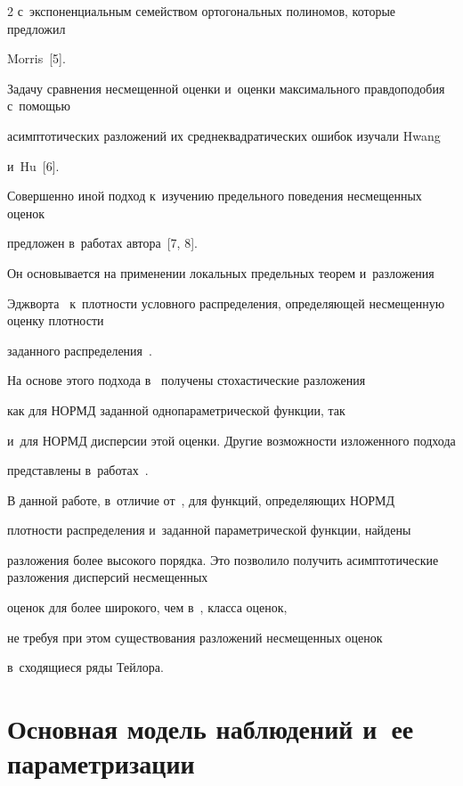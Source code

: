 \begin{multicols}{2}
  с~экспоненциальным семейством ортогональных полиномов, которые предложил


 Morris~[5].


  Задачу сравнения несмещенной оценки и~оценки максимального правдоподобия с~помощью


 асимптотических разложений их среднеквадратических ошибок изучали Hwang


 и~Hu~[6].





  Совершенно иной подход к~изучению предельного поведения несмещенных оценок


 предложен в~работах автора~[7, 8].


  Он основывается на применении локальных предельных теорем и~разложения


  Эджворта~\cite{10-ch, 9-ch} к~плотности условного распределения, определяющей несмещенную оценку плотности


 заданного распределения~\cite{1-ch, 11-ch}.


  На основе этого подхода в~\cite{12-ch} получены стохастические разложения


 как для НОРМД заданной однопа\-ра\-мет\-ри\-че\-ской функции, так 


 и~для НОРМД дисперсии этой оценки. Другие возможности изложенного подхода 


 представлены в~работах~\cite{13-ch, 14-ch}.





  В данной работе, в~отличие от~\cite{12-ch}, для функций, определяющих НОРМД


  плотности распределения и~заданной параметрической функции, найде\-ны


  разложения более высокого порядка. Это позволило получить асимптотические разложения дисперсий несмещенных


 оценок для более широкого, чем в~\cite{6-ch}, класса оценок,


 не требуя при этом существования разложений несмещенных оценок


 в~сходящиеся ряды Тейлора.


 


 \vspace*{-9pt}





\section{Основная модель наблюдений и~ее параметризации}






\end{multicols}

